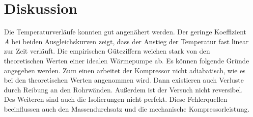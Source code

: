 \section{Diskussion}
\label{sec:Diskussion}

Die Temperaturverläufe konnten gut angenähert werden. Der geringe Koeffizient
$A$ bei beiden Ausgleichskurven zeigt, dass der Anstieg der Temperatur fast
linear zur Zeit verläuft.
Die empirischen Güteziffern weichen stark von den theoretischen Werten einer
idealen Wärmepumpe ab. Es können folgende Gründe angegeben werden. Zum einen arbeitet
der Kompressor nicht adiabatisch, wie es bei den theoretischen Werten angenommen wird.
Dann existieren auch Verluste durch Reibung an den Rohrwänden. Außerdem ist der Versuch
nicht reversibel. Des Weiteren sind auch die Isolierungen nicht perfekt.
Diese Fehlerquellen beeinflussen auch den Massendurchsatz und die mechanische
Kompressorleistung.
